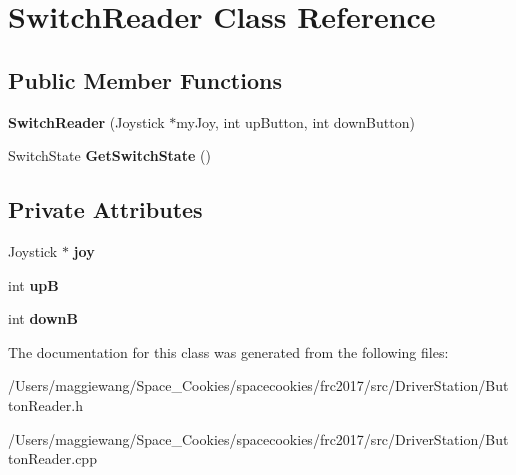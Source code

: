\hypertarget{class_switch_reader}{}\section{Switch\+Reader Class Reference}
\label{class_switch_reader}
\subsection*{Public Member Functions}
\begin{DoxyCompactItemize}
\item 
\mbox{\label{class_switch_reader_ae30fd88c0bb80f04a0994bd6ca9a8e25}} 
{\bfseries Switch\+Reader} (Joystick $\ast$my\+Joy, int up\+Button, int down\+Button)
\item 
\mbox{\label{class_switch_reader_a5e5ce06172f054194d20c79941c860da}} 
Switch\+State {\bfseries Get\+Switch\+State} ()
\end{DoxyCompactItemize}
\subsection*{Private Attributes}
\begin{DoxyCompactItemize}
\item 
\mbox{\label{class_switch_reader_a7bec529bd7fcb3415502ba6d3455453f}} 
Joystick $\ast$ {\bfseries joy}
\item 
\mbox{\label{class_switch_reader_a5c64b3e5505563f085f091a9e720e126}} 
int {\bfseries upB}
\item 
\mbox{\label{class_switch_reader_a8f8be0ecc7a2ffa154532c454177ec78}} 
int {\bfseries downB}
\end{DoxyCompactItemize}


The documentation for this class was generated from the following files\+:\begin{DoxyCompactItemize}
\item 
/\+Users/maggiewang/\+Space\+\_\+\+Cookies/spacecookies/frc2017/src/\+Driver\+Station/Button\+Reader.\+h\item 
/\+Users/maggiewang/\+Space\+\_\+\+Cookies/spacecookies/frc2017/src/\+Driver\+Station/Button\+Reader.\+cpp\end{DoxyCompactItemize}
